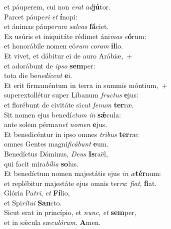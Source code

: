 \evenverse et páuperem, cui non \textit{e}\textit{rat} \textit{ad}\textbf{jú}tor.\\
\oddverse Parcet páupe\textit{ri} \textit{et} \textbf{í}nopi:~\*\\
\oddverse et ánimas páupe\textit{rum} \textit{sal}\textit{vas} \textbf{fá}ciet.\\
\evenverse Ex usúris et iniquitáte rédimet áni\textit{mas} \textit{e}\textbf{ó}rum:~\*\\
\evenverse et honorábile nomen eó\textit{rum} \textit{co}\textit{ram} \textbf{il}lo.\\
\oddverse Et vivet, et dábitur ei de auro Arábiæ,~+\\
\oddverse  et adorábunt de \textit{i}\textit{pso} \textbf{sem}per:~\*\\
\oddverse tota die be\textit{ne}\textit{dí}\textit{cent} \textbf{e}i.\\
\evenverse Et erit firmaméntum in terra in summis móntium,~+\\
\evenverse  superextollétur super Líbanum \textit{fru}\textit{ctus} \textbf{e}jus:~\*\\
\evenverse et florébunt de civitáte si\textit{cut} \textit{fe}\textit{num} \textbf{ter}ræ.\\
\oddverse Sit nomen ejus benedí\textit{ctum} \textit{in} \textbf{sǽ}cula:~\*\\
\oddverse ante solem pérma\textit{net} \textit{no}\textit{men} \textbf{e}jus.\\
\evenverse Et benedicéntur in ipso omnes \textit{tri}\textit{bus} \textbf{ter}ræ:~\*\\
\evenverse omnes Gentes magni\textit{fi}\textit{cá}\textit{bunt} \textbf{e}um.\\
\oddverse Benedíctus Dóminus, \textit{De}\textit{us} \textbf{Is}raël,~\*\\
\oddverse qui facit mira\textit{bí}\textit{li}\textit{a} \textbf{so}lus.\\
\evenverse Et benedíctum nomen majestátis ejus \textit{in} \textit{æ}\textbf{tér}num:~\*\\
\evenverse et replébitur majestáte ejus omnis ter\textit{ra}: \textit{fi}\textit{at}, \textbf{fi}at.\\
\oddverse Glória Pa\textit{tri}, \textit{et} \textbf{Fí}lio,~\*\\
\oddverse et Spi\textit{rí}\textit{tu}\textit{i} \textbf{San}cto.\\
\evenverse Sicut erat in princípio, et \textit{nunc}, \textit{et} \textbf{sem}per,~\*\\
\evenverse et in sǽcula sæ\textit{cu}\textit{ló}\textit{rum}. \textbf{A}men.\\
